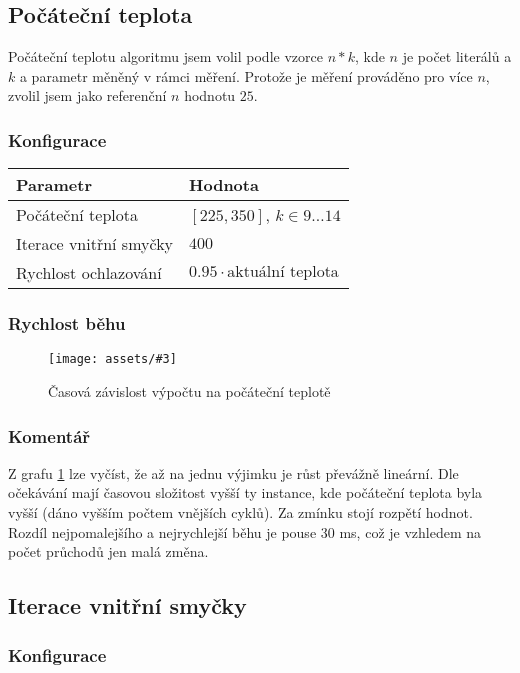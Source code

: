 \documentclass[czech]{article}
\newcommand{\image}[3]{
    \begin{figure}[H]
        \centering
        \texttt{[image: assets/\#3]}
        \caption{#2}
        \label{fig:#1}
    \end{figure}
}
\begin{document}
\subsection{Počáteční teplota}

Počáteční teplotu algoritmu jsem volil podle vzorce $n*k$, kde $n$ je počet literálů a $k$ a parametr měněný v rámci měření.
Protože je měření prováděno pro více $n$, zvolil jsem jako referenční $n$ hodnotu $25$.

\subsubsection*{Konfigurace}

\begin{tabular}{ | l | l | }
    \hline
    Parametr & Hodnota \\ \hline \hline
    Počáteční teplota & $[225, 350]$, $k \in 9\dots14$ \\
    Iterace vnitřní smyčky & $400$ \\
    Rychlost ochlazování & $0.95 \cdot \textrm{aktuální teplota}$ \\ \hline
\end{tabular}

\subsubsection*{Rychlost běhu}

\image{initial-temperature}{Časová závislost výpočtu na počáteční teplotě}{initial-temperature.png}

\subsubsection*{Komentář}

Z grafu \ref{fig:initial-temperature} lze vyčíst, že až na jednu výjimku je růst převážně lineární.
Dle očekávání mají časovou složitost vyšší ty instance, kde počáteční teplota byla vyšší (dáno vyšším počtem vnějších cyklů).
Za zmínku stojí rozpětí hodnot.
Rozdíl nejpomalejšího a nejrychlejší běhu je pouse $30$ ms, což je vzhledem na počet průchodů jen malá změna.

\subsection{Iterace vnitřní smyčky}

\subsubsection*{Konfigurace}
\end{document}

